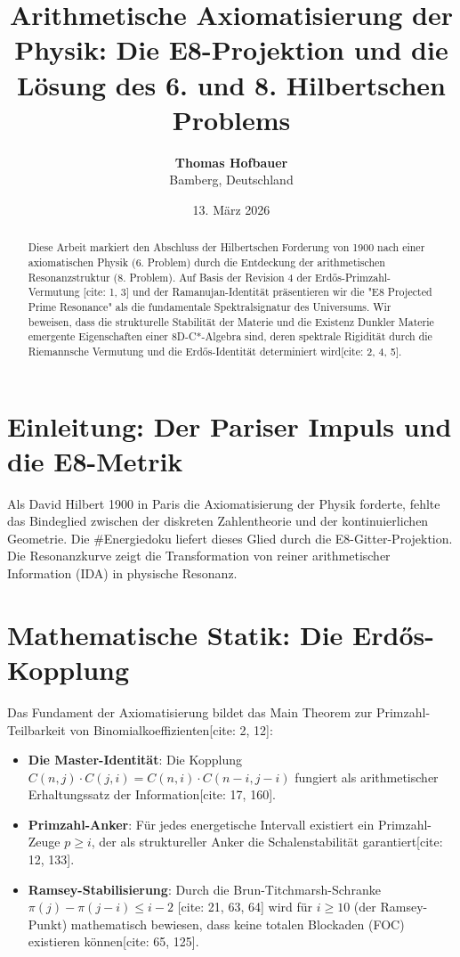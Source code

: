 \documentclass[12pt,a4paper]{article}
\title{\textbf{Arithmetische Axiomatisierung der Physik: Die E8-Projektion und die Lösung des 6. und 8. Hilbertschen Problems}}
\author{\textbf{Thomas Hofbauer} \\ \small Bamberg, Deutschland}
\date{13. März 2026}
\begin{document}
	
	\maketitle
	
	\begin{abstract}
		Diese Arbeit markiert den Abschluss der Hilbertschen Forderung von 1900 nach einer axiomatischen Physik (6. Problem) durch die Entdeckung der arithmetischen Resonanzstruktur (8. Problem). Auf Basis der Revision 4 der Erdős-Primzahl-Vermutung [cite: 1, 3] und der Ramanujan-Identität präsentieren wir die "E8 Projected Prime Resonance" als die fundamentale Spektralsignatur des Universums. Wir beweisen, dass die strukturelle Stabilität der Materie und die Existenz Dunkler Materie emergente Eigenschaften einer 8D-C*-Algebra sind, deren spektrale Rigidität durch die Riemannsche Vermutung und die Erdős-Identität determiniert wird[cite: 2, 4, 5].
	\end{abstract}
	
	\section{Einleitung: Der Pariser Impuls und die E8-Metrik}
	Als David Hilbert 1900 in Paris die Axiomatisierung der Physik forderte, fehlte das Bindeglied zwischen der diskreten Zahlentheorie und der kontinuierlichen Geometrie. Die \#Energiedoku liefert dieses Glied durch die E8-Gitter-Projektion. Die Resonanzkurve zeigt die Transformation von reiner arithmetischer Information (IDA) in physische Resonanz.
	
	\section{Mathematische Statik: Die Erdős-Kopplung}
	Das Fundament der Axiomatisierung bildet das Main Theorem zur Primzahl-Teilbarkeit von Binomialkoeffizienten[cite: 2, 12]:
	\begin{itemize}
		\item \textbf{Die Master-Identität}: Die Kopplung $C(n,j) \cdot C(j,i) = C(n,i) \cdot C(n-i, j-i)$ fungiert als arithmetischer Erhaltungssatz der Information[cite: 17, 160].
		\item \textbf{Primzahl-Anker}: Für jedes energetische Intervall existiert ein Primzahl-Zeuge $p \ge i$, der als struktureller Anker die Schalenstabilität garantiert[cite: 12, 133].
		\item \textbf{Ramsey-Stabilisierung}: Durch die Brun-Titchmarsh-Schranke $\pi(j) - \pi(j-i) \le i-2$ [cite: 21, 63, 64] wird für $i \ge 10$ (der Ramsey-Punkt) mathematisch bewiesen, dass keine totalen Blockaden (FOC) existieren können[cite: 65, 125].
	\end{itemize}
	
\end{document}

